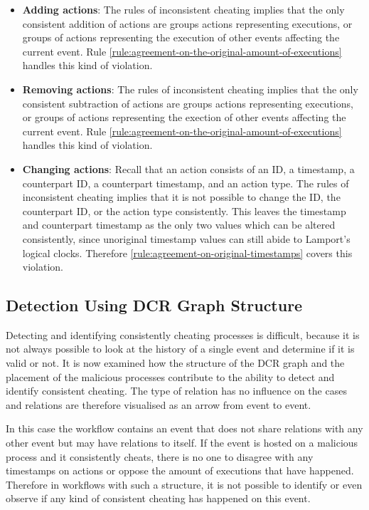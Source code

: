 	\begin{itemize}
		\item \textbf{Adding actions}: The rules of inconsistent cheating implies that the only consistent addition of actions are groups actions representing executions, or groups of actions representing the execution of other events affecting the current event. Rule  \ref{rule:agreement-on-the-original-amount-of-executions} handles this kind of violation.
		\item \textbf{Removing actions}: The rules of inconsistent cheating implies that the only consistent subtraction of actions are groups actions representing executions, or groups of actions representing the exection of other events affecting the current event. Rule  \ref{rule:agreement-on-the-original-amount-of-executions} handles this kind of violation.
		\item \textbf{Changing actions}: Recall that an action consists of an ID, a timestamp, a counterpart ID, a counterpart timestamp, and an action type. The rules of inconsistent cheating implies that it is not possible to change the ID, the counterpart ID, or the action type consistently. This leaves the timestamp and counterpart timestamp as the only two values which can be altered consistently, since unoriginal timestamp values can still abide to Lamport's logical clocks. Therefore \autoref{rule:agreement-on-original-timestamps} covers this violation.
	\end{itemize}
	
	\subsection{Detection Using DCR Graph Structure}
	Detecting and identifying consistently cheating processes is difficult, because it is not always possible to look at the history of a single event and determine if it is valid or not. It is now examined how the structure of the DCR graph and the placement of the malicious processes contribute to the ability to detect and identify consistent cheating. The type of relation has no influence on the cases and relations are therefore visualised as an arrow from event to event.
	
	\begin{case}
		In this case the workflow contains an event that does not share relations with any other event but may have relations to itself. If the event is hosted on a malicious process and it consistently cheats, there is no one to disagree with any timestamps on actions or oppose the amount of executions that have happened. Therefore in workflows with such a structure, it is not possible to identify or even observe if any kind of consistent cheating has happened on this event. 
		\label{case:malicious-alone}
	\end{case}
	
